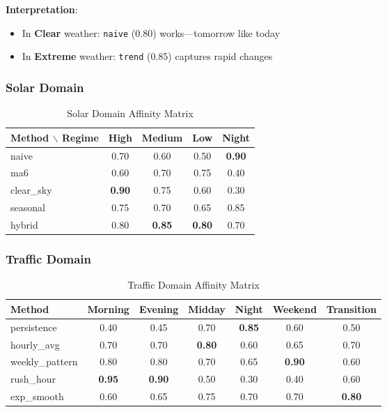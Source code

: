 \documentclass[11pt,a4paper]{article}
\theoremstyle{definition}
\theoremstyle{plain}
\begin{document}
\textbf{Interpretation}:
\begin{itemize}
    \item In \textbf{Clear} weather: \texttt{naive} (0.80) works---tomorrow like today
    \item In \textbf{Extreme} weather: \texttt{trend} (0.85) captures rapid changes
\end{itemize}

\subsubsection{Solar Domain}

\begin{table}[h]
\centering
\caption{Solar Domain Affinity Matrix}
\begin{tabular}{l|cccc}
\toprule
Method $\backslash$ Regime & High & Medium & Low & Night \\
\midrule
naive & 0.70 & 0.60 & 0.50 & \textbf{0.90} \\
ma6 & 0.60 & 0.70 & 0.75 & 0.40 \\
clear\_sky & \textbf{0.90} & 0.75 & 0.60 & 0.30 \\
seasonal & 0.75 & 0.70 & 0.65 & 0.85 \\
hybrid & 0.80 & \textbf{0.85} & \textbf{0.80} & 0.70 \\
\bottomrule
\end{tabular}
\end{table}

\subsubsection{Traffic Domain}

\begin{table}[h]
\centering
\caption{Traffic Domain Affinity Matrix}
\begin{tabular}{l|cccccc}
\toprule
Method & Morning & Evening & Midday & Night & Weekend & Transition \\
\midrule
persistence & 0.40 & 0.45 & 0.70 & \textbf{0.85} & 0.60 & 0.50 \\
hourly\_avg & 0.70 & 0.70 & \textbf{0.80} & 0.60 & 0.65 & 0.70 \\
weekly\_pattern & 0.80 & 0.80 & 0.70 & 0.65 & \textbf{0.90} & 0.60 \\
rush\_hour & \textbf{0.95} & \textbf{0.90} & 0.50 & 0.30 & 0.40 & 0.60 \\
exp\_smooth & 0.60 & 0.65 & 0.75 & 0.70 & 0.70 & \textbf{0.80} \\
\bottomrule
\end{tabular}
\end{table}
\end{document}
